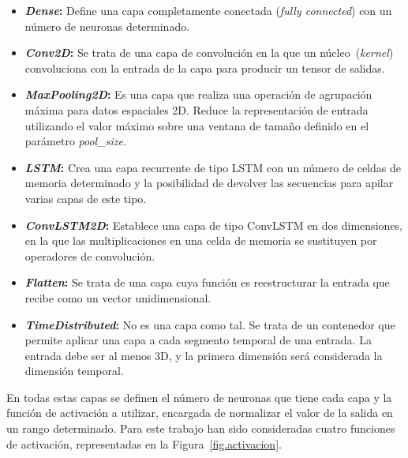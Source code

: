 \begin{itemize}
    \item \textbf{\textit{Dense}:} Define una capa completamente conectada (\textit{fully connected}) con un número de neuronas determinado.
    \item \textbf{\textit{Conv2D}:} Se trata de una capa de convolución en la que un núcleo~(\textit{kernel}) convoluciona con la entrada de la capa para producir un tensor de salidas.
    \item \textbf{\textit{MaxPooling2D}:} Es una capa que realiza una operación de agrupación máxima para datos espaciales 2D. Reduce la representación de entrada utilizando el valor máximo sobre una ventana de tamaño definido en el parámetro \textit{pool}\_\textit{size}. 
    \item \textbf{\textit{LSTM}:} Crea una capa recurrente de tipo LSTM con un número de celdas de memoria determinado y la posibilidad de devolver las secuencias para apilar varias capas de este tipo.
    \item \textbf{\textit{ConvLSTM2D}:} Establece una capa de tipo ConvLSTM en dos dimensiones, en la que las multiplicaciones en una celda de memoria se sustituyen por operadores de convolución.
    \item \textbf{\textit{Flatten}:} Se trata de una capa cuya función es reestructurar la entrada que recibe como un vector unidimensional.
    \item \textbf{\textit{TimeDistributed}:} No es una capa como tal. Se trata de un contenedor que permite aplicar una capa a cada segmento temporal de una entrada. La entrada debe ser al menos 3D, y la primera dimensión será considerada la dimensión temporal.
\end{itemize}

En todas estas capas se definen el número de neuronas que tiene cada capa y la función de activación a utilizar, encargada de normalizar el valor de la salida en un rango determinado. Para este trabajo han sido consideradas cuatro funciones de activación, representadas en la Figura~\ref{fig.activacion}.

